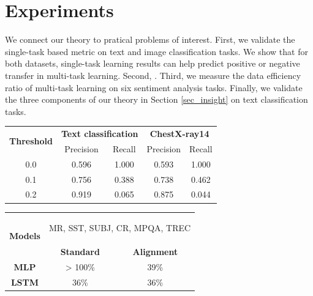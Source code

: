 \section{Experiments}

We connect our theory to pratical problems of interest.
First, we validate the single-task based metric on text and image classification tasks.
We show that for both datasets, single-task learning results can help predict positive or negative transfer in multi-task learning.
Second, \todo{}.
Third, we measure the data efficiency ratio of multi-task learning on six sentiment analysis tasks.
Finally, we validate the three components of our theory in Section \ref{sec_insight} on text classification tasks.

\begin{table}
\begin{minipage}[t]{.58\textwidth}
	\centering
  \begin{tabular}{c c c c c}
	\toprule
		\multirow{2}{*}{{\bf Threshold}}  & \multicolumn{2}{c}{{\bf Text
		classification}} & \multicolumn{2}{c}{{\bf ChestX-ray14}} \\
		& Precision &  Recall & Precision &  Recall \\
		\cmidrule(lr){1-1} \cmidrule(lr){2-3} \cmidrule(lr){4-5}
		0.0 & 0.596 & 1.000 & 0.593 & 1.000 \\
		0.1 & 0.756 & 0.388 & 0.738 & 0.462 \\
		0.2 & 0.919 & 0.065 & 0.875 & 0.044 \\
	\bottomrule
	\end{tabular}
	\vspace{0.1in}
	\label{tab:mtl_better_than_stl}
\end{minipage}
\quad
\begin{minipage}[t]{.40\textwidth}
	\centering
	\begin{tabular}{c c c}
		\toprule
		\multirow{2}{*}{{\bf Models}} & \multicolumn{2}{c}{\begin{minipage}{1.1in}\begin{center}
		MR, SST, SUBJ, CR, MPQA, TREC\end{center}\end{minipage}} \\
		\cmidrule(lr){2-3}
		& {\bf Standard} & {\bf Alignment} \\
		\midrule
		{\bf MLP}  & > 100\% & 39\% \\
		{\bf LSTM} & 36\% & 36\% \\
		\bottomrule
		\end{tabular}
	\vspace{0.1in}
	\label{tab:taskonomy}
\end{minipage}
\end{table}

